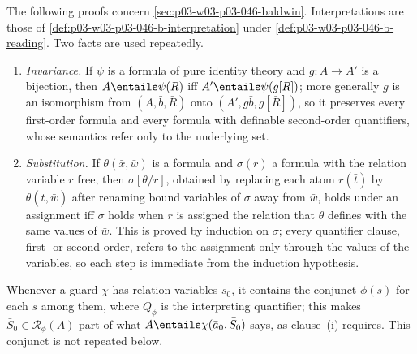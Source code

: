 The following proofs concern \cref{sec:p03-w03-p03-046-baldwin}.
Interpretations are those of \cref{def:p03-w03-p03-046-b-interpretation}
under \cref{def:p03-w03-p03-046-b-reading}. Two facts are used
repeatedly.
\begin{enumerate}
  \item[(F1)] \emph{Invariance.} If \(\psi\) is a formula of pure identity
        theory and \(g\colon A\to A'\) is a bijection, then
        \(A\entails\psi(\bar R)\) iff \(A'\entails\psi(g[\bar R])\); more
        generally \(g\) is an isomorphism from \((A,\bar b,\bar R)\) onto
        \((A',g\bar b,g[\bar R])\), so it preserves every first-order
        formula and every formula with definable second-order quantifiers,
        whose semantics refer only to the underlying set.
  \item[(F2)] \emph{Substitution.} If \(\theta(\bar x,\bar w)\) is a
        formula and \(\sigma(r)\) a formula with the relation variable
        \(r\) free, then \(\sigma[\theta/r]\), obtained by replacing each
        atom \(r(\bar t)\) by \(\theta(\bar t,\bar w)\) after renaming bound
        variables of \(\sigma\) away from \(\bar w\), holds under an
        assignment iff \(\sigma\) holds when \(r\) is assigned the relation
        that \(\theta\) defines with the same values of \(\bar w\). This is
        proved by induction on \(\sigma\); every quantifier clause, first-
        or second-order, refers to the assignment only through the values of
        the variables, so each step is immediate from the induction
        hypothesis.
\end{enumerate}
Whenever a guard \(\chi\) has relation variables \(\bar s_0\), it contains
the conjunct \(\phi(s)\) for each \(s\) among them, where \(Q_\phi\) is the
interpreting quantifier; this makes \(\bar S_0\in\mathscr R_\phi(A)\) part
of what \(A\entails\chi(\bar a_0,\bar S_0)\) says, as clause~(i) requires.
This conjunct is not repeated below.

